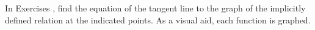 {\noindent In Exercises}
{, find the equation of the tangent line to  the graph of the  implicitly defined relation at the indicated points. As a visual aid, each function is graphed.
}
